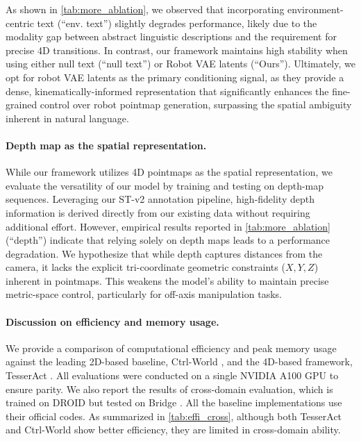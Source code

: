 \begin{appendices}
As shown in \cref{tab:more_ablation}, we observed that incorporating environment-centric text (“env. text”) slightly degrades performance, likely due to the modality gap between abstract linguistic descriptions and the requirement for precise 4D transitions. In contrast, our framework maintains high stability when using either null text (“null text”) or Robot VAE latents (“Ours”). Ultimately, we opt for robot VAE latents as the primary conditioning signal, as they provide a dense, kinematically-informed representation that significantly enhances the fine-grained control over robot pointmap generation, surpassing the spatial ambiguity inherent in natural language. 


\paragraph{Depth map as the spatial representation.}
While our framework utilizes 4D pointmaps as the spatial representation, we evaluate the versatility of our model by training and testing on depth-map sequences. Leveraging our ST-v2 \cite{xiao2025spatialtracker} annotation pipeline, high-fidelity depth information is derived directly from our existing data without requiring additional effort. However, empirical results reported in \cref{tab:more_ablation} (“depth”) indicate that relying solely on depth maps leads to a performance degradation. We hypothesize that while depth captures distances from the camera, it lacks the explicit tri-coordinate geometric constraints ($X, Y, Z$) inherent in pointmaps. This weakens the model's ability to maintain precise metric-space control, particularly for off-axis manipulation tasks. 

\paragraph{Discussion on efficiency and memory usage.}
We provide a comparison of computational efficiency and peak memory usage against the leading 2D-based baseline, Ctrl-World \cite{guo2026ctrl}, and the 4D-based framework, TesserAct \cite{zhen2025tesseract}. 
All evaluations were conducted on a single NVIDIA A100 GPU to ensure parity. We also report the results of cross-domain evaluation, which is trained on DROID \cite{khazatsky2024droid} but tested on Bridge \cite{walke2023bridgedata}. All the baseline implementations use their official codes.
As summarized in \cref{tab:effi_cross}, although both TesserAct and Ctrl-World show better efficiency, they are limited in cross-domain ability.


\end{appendices}
